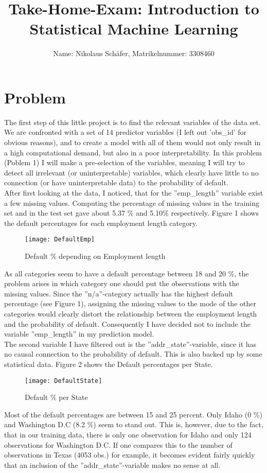 \documentclass[11pt,a4paper,numbers=endperiod]{article}
\title{Take-Home-Exam: Introduction to Statistical Machine Learning}
\author{Name: Nikolaus Schäfer, \hspace*{1mm} Matrikelnummer: 3308460}
\begin{document}
	\maketitle
	\section{Problem}
	\onehalfspacing
	The first step of this little project is to find the relevant variables of the data set. We are confronted with a set of 14 predictor variables (I left out 'obs\_id' for obvious reasons), and to create a model with all of them would not only result in a high computational demand, but also in a poor interpretability. In this problem (Poblem 1) I will make a pre-selection of the variables, meaning I will try to detect all irrelevant (or uninterpretable) variables, which clearly have little to no connection (or have uninterpretable data) to the probability of default.\\
 	After first looking at the data, I noticed, that for the ''emp\_length'' variable exist a few missing values. Computing the percentage of missing values in the training set and in the test set gave about 5.37 \% and 5.10\% respectively. Figure 1 shows the default percentages for each employment length category. 
 	\begin{figure}[!ht]
 		\centering
 		\texttt{[image: DefaultEmp]} 
 		\caption{Default \% depending on Employment length}
 	\end{figure}
 	As all categories seem to have a default percentage between 18 and 20 \%, the problem arises in which category one should put the observations with the missing values. Since the ''n/a''-category actually has the highest default percentage (see Figure 1), assigning the missing values to the mode of the other categories would clearly distort the relationship between the employment length and the probability of default. Consequently I have decided not to include the variable ''emp\_length'' in my prediction model.\\
	The second variable I have filtered out is the ''addr\_state''-variable, since it has no causal connection to the probability of default. This is also backed up by some statistical data. Figure 2 shows the Default percentages per State. 
	\begin{figure}[!ht]
		\texttt{[image: DefaultState]} 
		\caption{Default \% per State}
	\end{figure}
	Most of the default percentages are between 15 and 25 percent. Only Idaho (0 \%) and Washington D.C (8.2 \%) seem to stand out. This is, however, due to the fact, that in our training data, there is only one observation for Idaho and only 124 observations for Washington D.C. If one compares this to the number of observations in Texas (4053 obs.) for example, it becomes evident fairly quickly that an inclusion of the ''addr\_state''-variable makes no sense at all.\\
\end{document}
